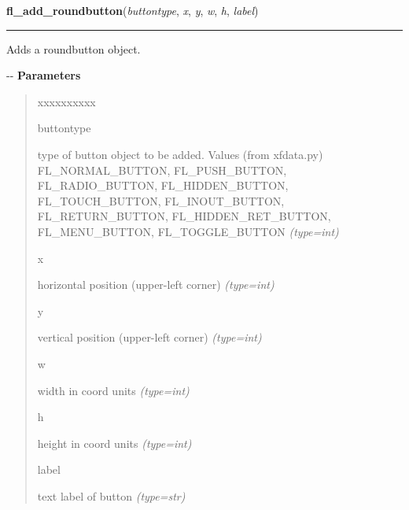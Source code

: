     \vspace{0.5ex}

\hspace{.8\funcindent}\begin{boxedminipage}{\funcwidth}

    \raggedright \textbf{fl\_add\_roundbutton}(\textit{buttontype}, \textit{x}, \textit{y}, \textit{w}, \textit{h}, \textit{label})

    \vspace{-1.5ex}

    \rule{\textwidth}{0.5\fboxrule}
\setlength{\parskip}{2ex}

Adds a roundbutton object.

-{}-
\setlength{\parskip}{1ex}
      \textbf{Parameters}
      \vspace{-1ex}

      \begin{quote}
        \begin{Ventry}{xxxxxxxxxx}

          \item[buttontype]


type of button object to be added. Values (from xfdata.py)
FL\_NORMAL\_BUTTON, FL\_PUSH\_BUTTON, FL\_RADIO\_BUTTON, FL\_HIDDEN\_BUTTON,
FL\_TOUCH\_BUTTON, FL\_INOUT\_BUTTON, FL\_RETURN\_BUTTON,
FL\_HIDDEN\_RET\_BUTTON, FL\_MENU\_BUTTON, FL\_TOGGLE\_BUTTON
            {\it (type=int)}

          \item[x]


horizontal position (upper-left corner)
            {\it (type=int)}

          \item[y]


vertical position (upper-left corner)
            {\it (type=int)}

          \item[w]


width in coord units
            {\it (type=int)}

          \item[h]


height in coord units
            {\it (type=int)}

          \item[label]


text label of button
            {\it (type=str)}

        \end{Ventry}

      \end{quote}


\end{boxedminipage}
